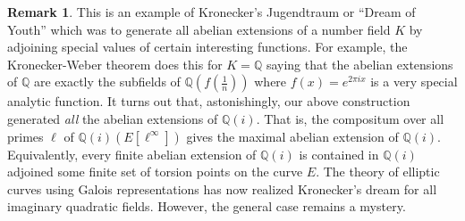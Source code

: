\documentclass{article}
\newcommand{\Q}{\mathbb{Q}}
\theoremstyle{definition}
\newtheorem{remark}{Remark}[section]
\begin{document}
\begin{remark}
This is an example of Kronecker's Jugendtraum or ``Dream of Youth'' which was to generate all abelian extensions of a number field $K$ by adjoining special values of certain interesting functions. For example, the Kronecker-Weber theorem does this for $K = \Q$ saying that the abelian extensions of $\Q$ are exactly the subfields of $\Q(f(\tfrac{1}{n}))$ where $f(x) = e^{2 \pi i x}$ is a very special analytic function. It turns out that, astonishingly, our above construction generated \textit{all} the abelian extensions of $\Q(i)$. That is, the compositum over all primes $\ell$ of $\Q(i)(E[\ell^\infty])$ gives the maximal abelian extension of $\Q(i)$. Equivalently, every finite abelian extension of $\Q(i)$ is contained in $\Q(i)$ adjoined some finite set of torsion points on the curve $E$. The theory of elliptic curves using Galois representations has now realized Kronecker's dream for all imaginary quadratic fields. However, the general case remains a mystery. 
\end{remark}
\end{document}

